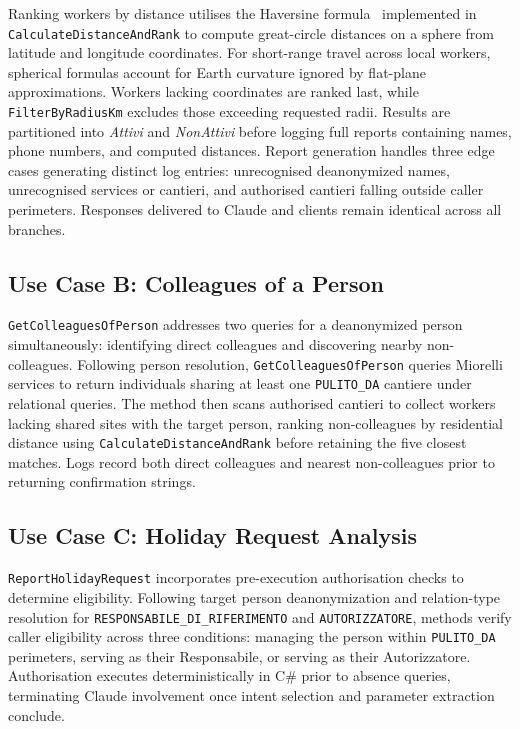 Ranking workers by distance utilises the Haversine formula~\cite{sinnott1984haversine} implemented in \texttt{CalculateDistanceAndRank} to compute great-circle distances on a sphere from latitude and longitude coordinates. For short-range travel across local workers, spherical formulas account for Earth curvature ignored by flat-plane approximations. Workers lacking coordinates are ranked last, while \texttt{FilterByRadiusKm} excludes those exceeding requested radii. Results are partitioned into \emph{Attivi} and \emph{NonAttivi} before logging full reports containing names, phone numbers, and computed distances. Report generation handles three edge cases generating distinct log entries: unrecognised deanonymized names, unrecognised services or cantieri, and authorised cantieri falling outside caller perimeters. Responses delivered to Claude and clients remain identical across all branches.

\subsection{Use Case B: Colleagues of a Person}
\label{subsec:impl_ucb}

\texttt{GetColleaguesOfPerson} addresses two queries for a deanonymized person simultaneously: identifying direct colleagues and discovering nearby non-colleagues. Following person resolution, \texttt{GetColleaguesOfPerson} queries Miorelli services to return individuals sharing at least one \texttt{PULITO\_DA} cantiere under relational queries. The method then scans authorised cantieri to collect workers lacking shared sites with the target person, ranking non-colleagues by residential distance using \texttt{CalculateDistanceAndRank} before retaining the five closest matches. Logs record both direct colleagues and nearest non-colleagues prior to returning confirmation strings.

\subsection{Use Case C: Holiday Request Analysis}
\label{subsec:impl_ucc}

\texttt{ReportHolidayRequest} incorporates pre-execution authorisation checks to determine eligibility. Following target person deanonymization and relation-type resolution for \texttt{RESPONSABILE\_DI\_RIFERIMENTO} and \texttt{AUTORIZZATORE}, methods verify caller eligibility across three conditions: managing the person within \texttt{PULITO\_DA} perimeters, serving as their Responsabile, or serving as their Autorizzatore. Authorisation executes deterministically in C\# prior to absence queries, terminating Claude involvement once intent selection and parameter extraction conclude.

